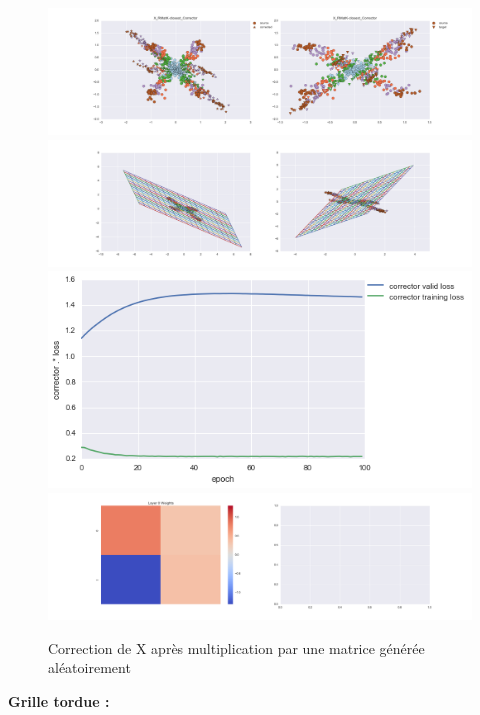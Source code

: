 \begin{figure}[H] %
\centering
\includegraphics[width=\linewidth]{fig/24-05-2016/X/X_RMatK-closest_Corrector-DATA.png}
\includegraphics[width=\linewidth]{fig/24-05-2016/X/X_RMatK-closest_Corrector-GridCheck.png}
\includegraphics[width=0.45\linewidth]{fig/24-05-2016/X/X_RMatK-closest_Corrector-Learning_curve.png}
\includegraphics[width=\linewidth]{fig/24-05-2016/X/X_RMatK-closest_Corrector-W.png}
\caption{Correction de X après multiplication par une matrice générée aléatoirement}
\label{fig:recap-X-RMat-exhaustive}
\end{figure}

{\Large \textbf{Grille tordue :}}

